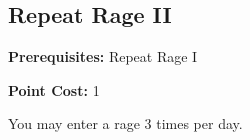 \subsection*{Repeat Rage II}\label{feat:repeatrage2}

\noindent
\textbf{Prerequisites:} Repeat Rage I

\noindent
\textbf{Point Cost:} 1

You may enter a rage 3 times per day.
